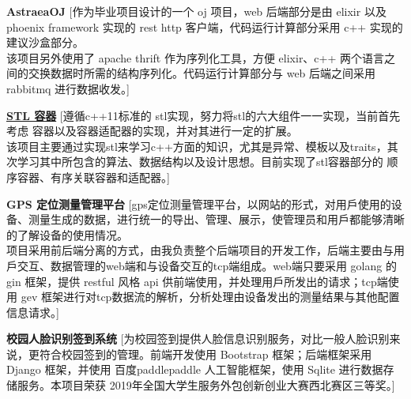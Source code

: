 \documentclass[zh]{resume}
\begin{document}
\begin{experiences}
  {\textbf{AstraeaOJ}}%
  [作为毕业项目设计的一个 oj 项目，web 后端部分是由 elixir 以及 phoenix framework 实现的 rest http 客户端，代码运行计算部分采用 c++ 实现的建议沙盒部分。\\该项目另外使用了 apache thrift 作为序列化工具，方便 elixir、c++ 两个语言之间的交换数据时所需的结构序列化。代码运行计算部分与 web 后端之间采用 rabbitmq 进行数据收发。]

  \separator{1.2ex}

  {\href{https://github.com/ginshio/stl}{\bf STL 容器}}%
  [遵循c++11标准的 stl实现，努力将stl的六大组件一一实现，当前首先考虑 容器以及容器适配器的实现，并对其进行一定的扩展。\\该项目主要通过实现stl来学习c++方面的知识，尤其是异常、模板以及traits，其次学习其中所包含的算法、数据结构以及设计思想。目前实现了stl容器部分的 顺序容器、有序关联容器和适配器。]

  \separator{1.2ex}

  {\bf GPS 定位测量管理平台}%
  [gps定位测量管理平台，以网站的形式，对用戶使用的设备、测量生成的数据，进行统一的导出、管理、展示，使管理员和用戶都能够清晰的了解设备的使用情况。\\项目采用前后端分离的方式，由我负责整个后端项目的开发工作，后端主要由与用戶交互、数据管理的web端和与设备交互的tcp端组成。web端只要采用 golang 的 gin 框架，提供 restful ⻛格 api 供前端使用，并处理用戶所发出的请求；tcp端使用 gev 框架进行对tcp数据流的解析，分析处理由设备发出的测量结果与其他配置信息请求。]

  \separator{1.2ex}

  {\textbf{校园人脸识别签到系统}}%
  [为校园签到提供人脸信息识别服务，对比一般人脸识别来说，更符合校园签到的管理。前端开发使用 Bootstrap 框架；后端框架采用 Django 框架，并使用 百度paddlepaddle 人工智能框架，使用 Sqlite 进行数据存储服务。本项目荣获 2019年全国大学生服务外包创新创业大赛西北赛区三等奖。]
\end{experiences}
\end{document}
